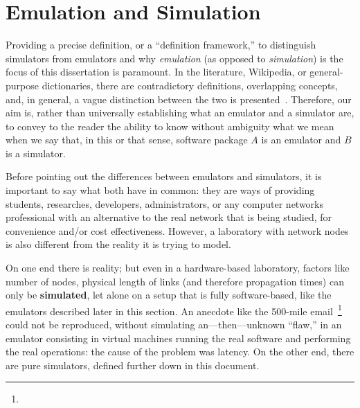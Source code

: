 \section{Emulation and Simulation}
\label{sec:leavingemulationandsimulation}

Providing a precise definition, or a ``definition framework,'' to distinguish simulators from emulators and why \emph{emulation} (as opposed to \emph{simulation}) is the focus of this dissertation is paramount.
In the literature, Wikipedia, or general-purpose dictionaries, there are contradictory definitions, overlapping concepts, and, in general, a vague distinction between the two is presented~\cite{netsimoremu}.
Therefore, our aim is, rather than universally establishing what an emulator and a simulator are, to convey to the reader the ability to know without ambiguity what we mean when we say that, in this or that sense, software package $A$ is an emulator and $B$ is a simulator.

Before pointing out the differences between emulators and simulators, it is important to say what both have in common: they are ways of providing students, researches, developers, administrators, or any computer networks professional with an alternative to the real network that is being studied, for convenience and/or cost effectiveness.
However, a laboratory with network nodes is also different from the reality it is trying to model.

On one end there is reality; but even in a hardware-based laboratory, factors like number of nodes, physical length of links (and therefore propagation times) can only be \textbf{simulated}, let alone on a setup that is fully software-based, like the emulators described later in this section.
An anecdote like the 500-mile email~\footnote{} could not be reproduced, without simulating an---then---unknown ``flaw,'' in an emulator consisting in virtual machines running the real software and performing the real operations: the cause of the problem was latency.
On the other end, there are pure simulators, defined further down in this document.


